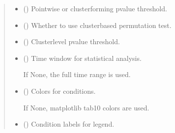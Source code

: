 \documentclass[letterpaper,10pt,english]{sphinxhowto}
\begin{document}
\begin{fulllineitems}
\begin{quote}
\begin{description}
\begin{itemize}
\item {} 
\sphinxAtStartPar
{} (\sphinxstyleliteralemphasis{\sphinxupquote{, }}) \textendash{} Point\sphinxhyphen{}wise or cluster\sphinxhyphen{}forming p\sphinxhyphen{}value threshold.

\item {} 
\sphinxAtStartPar
{} (\sphinxstyleliteralemphasis{\sphinxupquote{, }}) \textendash{} Whether to use cluster\sphinxhyphen{}based permutation test.

\item {} 
\sphinxAtStartPar
{} (\sphinxstyleliteralemphasis{\sphinxupquote{, }}) \textendash{} Cluster\sphinxhyphen{}level p\sphinxhyphen{}value threshold.

\item {} 
\sphinxAtStartPar
{} (\sphinxstyleliteralemphasis{\sphinxupquote{, }}) \textendash{} 
\sphinxAtStartPar
Time window for statistical analysis.

\sphinxAtStartPar
If None, the full time range is used.


\item {} 
\sphinxAtStartPar
{} (\sphinxstyleliteralemphasis{\sphinxupquote{, }}) \textendash{} 
\sphinxAtStartPar
Colors for conditions.

\sphinxAtStartPar
If None, matplotlib tab10 colors are used.


\item {} 
\sphinxAtStartPar
{} (\sphinxstyleliteralemphasis{\sphinxupquote{, }}) \textendash{} Condition labels for legend.


\end{itemize}
\end{description}
\end{quote}
\end{fulllineitems}
\end{document}
